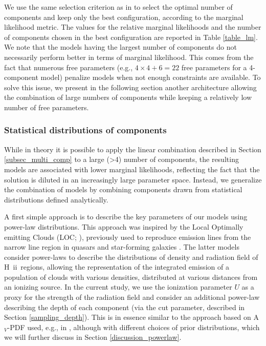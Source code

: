 \documentclass{aa}
\newcommand{\hii}{H~{\sc ii}}
\begin{document}
We use the same selection criterion as in \cite{Ramambason2022} to select the optimal number of components and keep only the best configuration, according to the marginal likelihood metric. The values for the relative marginal likelihoods and the number of components chosen in the best configuration are reported in Table \ref{table_lm}. We note that the models having the largest number of components do not necessarily perform better in terms of marginal likelihood. This comes from the fact that numerous free parameters (e.g., $4\times4+6=22$ free parameters for a 4-component model) penalize models when not enough constraints are available. To solve this issue, we present in the following section another architecture allowing the combination of large numbers of components while keeping a relatively low number of free parameters. 

\subsubsection{Statistical distributions of components}
\label{broken_plaw_models}

While in theory it is possible to apply the linear combination described in Section \ref{subsec_multi_comp} to a large (>4) number of components, the resulting models are associated with lower marginal likelihoods, reflecting the fact that the solution is diluted in an increasingly large parameter space. Instead, we generalize the combination of models by combining components drawn from statistical distributions defined analytically. 

A first simple approach is to describe the key parameters of our models using power-law distributions. This approach was inspired by the Local Optimally emitting Clouds (LOC; \citealt{Baldwin_1995}), previously used to reproduce emission lines from the narrow line region in quasars and star-forming galaxies \citep{Ferguson_1997,richardson_interpreting_2014,richardson_interpreting_2016}. The latter models consider power-laws to describe the distributions of density and radiation field of \hii\ regions, allowing the representation of the integrated emission of a population of clouds with various densities, distributed at various distances from an ionizing source. In the current study, we use the ionization parameter $U$ as a proxy for the strength of the radiation field and consider an additional power-law describing the depth of each component (via the cut parameter, described in Section \ref{sampling_depth}). This is in essence similar to the approach based on A$_V$-PDF used, e.g., in \cite{Bisbas_2019, Bisbas_2023}, although with different choices of prior distributions, which we will further discuss in Section \ref{discussion_powerlaw}. 
\end{document}
